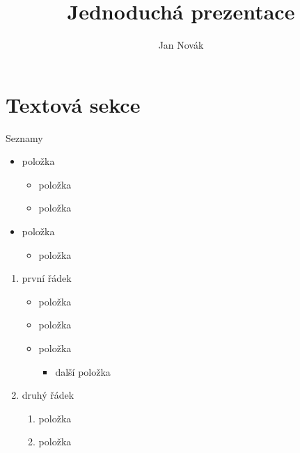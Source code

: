 \documentclass{beamer}							%
\author{Jan Novák}
\title{Jednoduchá prezentace}
\begin{document}
\maketitle



\section{Textová sekce}
\begin{frame}[fragile, shrink=0]{Seznamy}

	\begin{itemize}
		\item položka
		      \begin{itemize}
			      \item položka
			      \item položka
		      \end{itemize}
		\item položka
		      \begin{itemize}
			      \item položka
		      \end{itemize}
	\end{itemize}
	
		\begin{enumerate}
			\item první řádek
			\begin{itemize}
			      \item položka
			      \item položka
			      \item položka
			      \begin{itemize}
					\item další položka

				\end{itemize}
		      \end{itemize}
			\item druhý řádek
			  \begin{enumerate}
			      \item položka
			      \item položka
		      \end{enumerate}
		\end{enumerate}
	
\end{frame}
\end{document}
